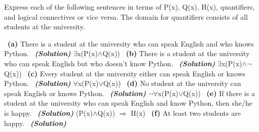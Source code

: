 \documentclass[a4 paper]{article}
\numberwithin{equation}{section}
\newcommand{\subproblem}[1]{~\newline\textbf{(#1)}}
\newcommand{\solution}{~\newline\textbf{\textit{(Solution)}} }
\newcommand{\0}{\mathbf{0}}
\begin{document}
Express each of the following sentences in terms of P(x), Q(x), H(x), quantifiers, and logical connectives or vice versa. The domain
for quantifiers consists of all students at the university.

\subproblem{a} There is a student at the university who can speak English and who knows Python.
\solution
\newline
\newline
    $\exists$\hspace{0.05cm}x(P(x)$\wedge$\hspace{0.05cm}Q(x))
\newline
\newline
\subproblem{b} There is a student at the university who can speak English but who doesn’t know Python.
\solution
\newline
\newline    
    $\exists$\hspace{0.05cm}x(P(x)$\wedge$\hspace{0.05cm}$\neg$Q(x))
\newline
\newline
\subproblem{c} Every student at the university either can speak English or knows Python.
\solution
\newline
\newline    
    $\forall$\hspace{0.05cm}x(P(x)$\vee$\hspace{0.05cm}Q(x))
\newline
\newline
\subproblem{d} No student at the university can speak English or knows Python.
\solution
\newline
\newline    
    $\neg$\hspace{0.05cm}$\forall$\hspace{0.05cm}x(P(x)$\vee$\hspace{0.05cm}Q(x))
\newline
\newline
\subproblem{e} If there is a student at the university who can speak English and know Python, then she/he is happy.
\solution
\newline
\newline    
    (P(x)$\wedge$\hspace{0.05cm}Q(x)) $\Rightarrow$ H(x)
\newline
\newline
\subproblem{f} At least two students are happy.
\solution
\newline
\end{document}
